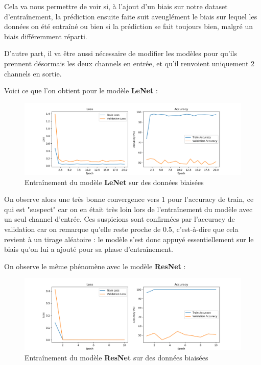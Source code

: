 \documentclass{report}
\begin{document}
Cela va nous permettre de voir si, à l'ajout d'un biais sur notre dataset d'entraînement, la prédiction 
ensuite faite suit aveuglément le biais sur lequel les données on été entraîné ou bien si la prédiction se
fait toujours bien, malgré un biais différemment réparti.

\newpage

D'autre part, il va être aussi nécessaire de modifier les modèles pour qu'ils prennent désormais les deux 
channels en entrée, et qu'il renvoient uniquement 2 channels en sortie.

Voici ce que l'on obtient pour le modèle \textbf{LeNet} :

\begin{figure}[H]
    \centering
    \includegraphics[width=\textwidth]{Sources/Graphiques/2./LeNet/training_results_bias_dropouts_1_0_1.png}
    \caption{Entraînement du modèle \textbf{LeNet} sur des données biaisées}
    \label{fig:LeNet_biased}
\end{figure}

On observe alors une très bonne convergence vers 1 pour l'accuracy de train, ce qui est "suspect" car on en 
était très loin lors de l'entraînement du modèle avec un seul channel d'entrée. Ces suspicions sont confirmées
par l'accuracy de validation car on remarque qu'elle reste proche de 0.5, c'est-à-dire que cela revient à un 
tirage aléatoire : le modèle s'est donc appuyé essentiellement sur le biais qu'on lui a ajouté pour sa phase 
d'entraînement. \newline

On observe le même phénomène avec le modèle \textbf{ResNet} :

\begin{figure}[H]
    \centering
    \includegraphics[width=\textwidth]{Sources/Graphiques/2./ResNet/training_results_bias_10_epochs.png}
    \caption{Entraînement du modèle \textbf{ResNet} sur des données biaisées}
    \label{fig:ResNet_biased}
\end{figure}
\end{document}

